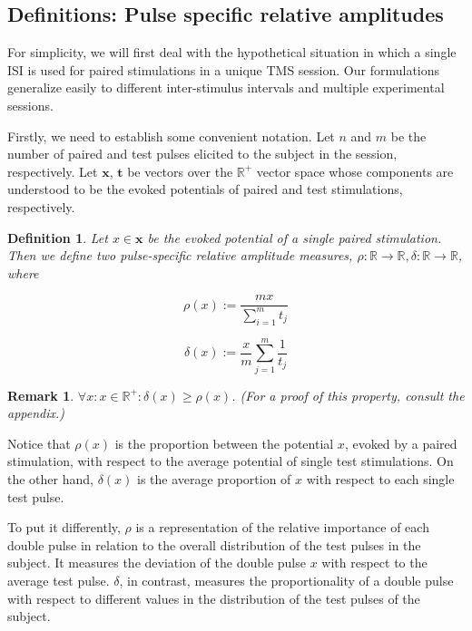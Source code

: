 \documentclass{article}
\newtheorem{definition}{Definition}
\newtheorem{remark}{Remark}
\begin{document}
\begin{multicols}{2}
\subsection{Definitions: Pulse specific relative amplitudes}

For simplicity, we will first deal with the hypothetical situation in which a
single ISI is used for paired stimulations in a unique TMS session. Our
formulations generalize easily to different inter-stimulus intervals and
multiple experimental sessions.

Firstly, we need to establish some convenient notation. Let $n$ and $m$ be the
number of paired and test pulses elicited to the subject in the session,
respectively. Let $\textbf{x}$, $\textbf{t}$ be vectors over the $\mathbb{R}^+$
vector space whose components are understood to be the evoked potentials of
paired and test stimulations, respectively.


\begin{definition} 


    Let $x \in \textbf{x}$ be the evoked potential of a single paired
    stimulation. Then we define two pulse-specific relative amplitude measures,
    $\rho : \mathbb{R} \to \mathbb{R}, \delta : \mathbb{R} \to \mathbb{R}$,
    where

    \begin{equation} 
        \rho(x) := \frac{mx}{\sum_{i=1}^mt_j}
    \end{equation}

    \begin{equation} 
        \delta(x) := \frac{x}{m}\sum_{j=1}^m\frac{1}{t_j} 
    \end{equation}
\end{definition}

\begin{remark} 
    $\forall x: x \in \mathbb{R}^+:\delta(x) \geq \rho(x)$. (For a proof of this
    property, consult the appendix.) 
\end{remark}

Notice that $\rho(x)$ is the proportion between the potential $x$, evoked by a
paired stimulation, with respect to the average potential of single test
stimulations. On the other hand, $\delta(x)$ is the average proportion of $x$
with respect to each single test pulse. 

To put it differently, $\rho$ is a representation of the relative importance of
each double pulse in relation to the overall distribution of the test pulses in
the subject. It measures the deviation of the double pulse $x$ with respect to
the average test pulse. $\delta$, in contrast, measures the proportionality of a
double pulse with respect to different values in the distribution of the test
pulses of the subject.


\end{multicols}
\end{document}
